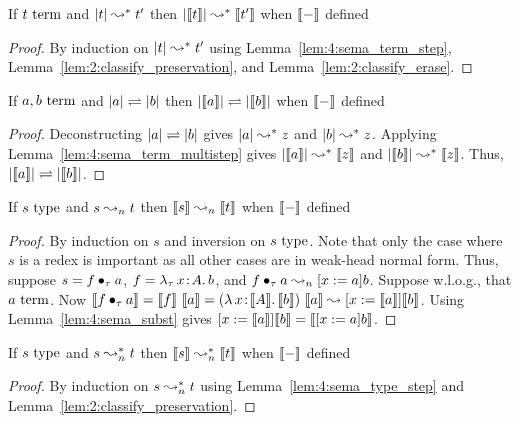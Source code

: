 \begin{lemma}
    \label{lem:4:sema_term_multistep}
    If $t~\textnormal{term}$ and $|t| \leadsto^* t^\prime$ then $|\llbracket t \rrbracket| \leadsto^* \llbracket t^\prime \rrbracket$ when $\llbracket - \rrbracket$ defined
\end{lemma}
\begin{proof}
    By induction on $|t| \leadsto^* t^\prime$ using Lemma~\ref{lem:4:sema_term_step}, Lemma~\ref{lem:2:classify_preservation}, and Lemma~\ref{lem:2:classify_erase}.
\end{proof}

\begin{lemma}
    \label{lem:4:sema_term_conv}
    If $a, b~\textnormal{term}$ and $|a| \rightleftharpoons |b|$ then $|\llbracket a \rrbracket| \rightleftharpoons |\llbracket b \rrbracket|$ when $\llbracket - \rrbracket$ defined
\end{lemma}
\begin{proof}
    Deconstructing $|a| \rightleftharpoons |b|$ gives $|a| \leadsto^* z$ and $|b| \leadsto^* z$.
    Applying Lemma~\ref{lem:4:sema_term_multistep} gives $|\llbracket a \rrbracket| \leadsto^* \llbracket z \rrbracket$ and $|\llbracket b \rrbracket| \leadsto^* \llbracket z \rrbracket$.
    Thus, $|\llbracket a \rrbracket| \rightleftharpoons |\llbracket b \rrbracket|$.
\end{proof}

\begin{lemma}
    \label{lem:4:sema_type_step}
    If $s~\textnormal{type}$ and $s \leadsto_n t$ then $\llbracket s \rrbracket \leadsto_n \llbracket t \rrbracket$ when $\llbracket - \rrbracket$ defined
\end{lemma}
\begin{proof}
    By induction on $s$ and inversion on $s~\textnormal{type}$.
    Note that only the case where $s$ is a redex is important as all other cases are in weak-head normal form.
    Thus, suppose $s = f \bullet_{\tau} a$,  $f = {\lambda_\tau}\, x\! : \! A.\, b$, and $f \bullet_{\tau} a \leadsto_n [x := a]b$.
    Suppose w.l.o.g., that $a~\textnormal{term}$.
    Now $\llbracket f \bullet_{\tau} a \rrbracket = \llbracket f \rrbracket\ \llbracket a \rrbracket = ({\lambda}\, x\! : \! \llbracket A \rrbracket.\, \llbracket b \rrbracket)\ \llbracket a \rrbracket \leadsto [x := \llbracket a \rrbracket]\llbracket b \rrbracket$.
    Using Lemma~\ref{lem:4:sema_subst} gives $[x := \llbracket a \rrbracket]\llbracket b \rrbracket = \llbracket [x := a]b \rrbracket$.
\end{proof}

\begin{lemma}
    \label{lem:4:sema_type_multistep}
    If $s~\textnormal{type}$ and $s \leadsto^*_n t$ then $\llbracket s \rrbracket \leadsto^*_n \llbracket t \rrbracket$ when $\llbracket - \rrbracket$ defined
\end{lemma}
\begin{proof}
    By induction on $s \leadsto^*_n t$ using Lemma~\ref{lem:4:sema_type_step} and Lemma~\ref{lem:2:classify_preservation}.
\end{proof}

